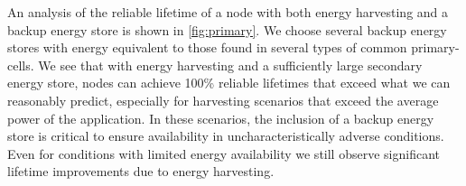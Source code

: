 An analysis of the reliable lifetime of a node with both energy
harvesting and a backup energy store is shown in \cref{fig:primary}.
We choose several backup energy
stores with energy equivalent to those found in several types of common
primary-cells. We see that with energy harvesting and a sufficiently
large secondary energy store, nodes can
achieve 100\% reliable lifetimes that exceed
what we can reasonably predict, especially for harvesting scenarios that
exceed the average power of the application. In these scenarios, 
the inclusion of a backup energy store is critical 
to ensure availability in uncharacteristically adverse conditions.
Even for conditions with
limited energy availability we still observe significant lifetime improvements
due to energy harvesting.

